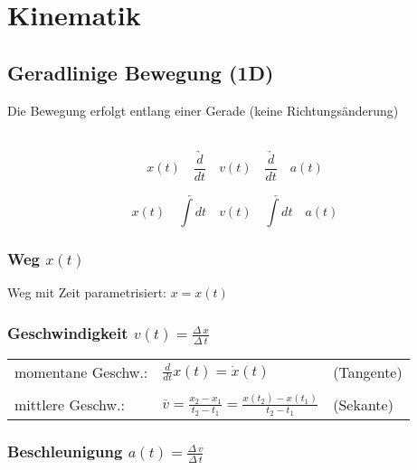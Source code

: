\section{Kinematik}
		

		
	\subsection{Geradlinige Bewegung (1D)}
	Die Bewegung erfolgt entlang einer Gerade (keine Richtungsänderung) \\
	\\
	\begin{minipage}{0.48\linewidth}
	\begin{equation*}
	x(t) \quad  \underrightarrow{ \frac{d}{dt}} \quad  v(t) \quad  \underrightarrow{ \frac{d}{dt}} \quad a(t)  
	\end{equation*}
	\end{minipage}
	\hfill
	\begin{minipage}{0.48\linewidth}
	\begin{equation*}
	x(t) \quad \underleftarrow{\int dt} \quad v(t) \quad \underleftarrow{\int dt} \quad a(t)
	\end{equation*}
	\end{minipage}
		

		
	\subsubsection{Weg $x(t)$}
	Weg mit Zeit parametrisiert: $x = x(t)$ 
		
		
		
	\subsubsection{Geschwindigkeit $v(t) = \frac{\Delta \, x}{\Delta \, t}$}
	
	\begin{tabular}{lll}
	momentane Geschw.: & $\frac{d}{dt} x(t) = \dot{x}(t)$ & (Tangente) \\	
	\\
	mittlere Geschw.: & $\overline{v} = \frac{x_2 -x_1}{t_2 - t_1} =  \frac{x(t_2) - x(t_1)}{t_2 - t_1} $  & (Sekante) \\
	\end{tabular}
		
		
		
	\subsubsection{Beschleunigung $a(t) = \frac{\Delta \, v}{\Delta \, t}$}
		
